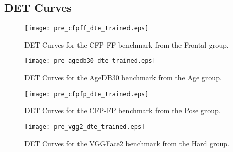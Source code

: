 \documentclass[class=report, crop=false, a4paper, 12pt]{standalone}
\begin{document}
\begin{appendix}
\chapter{DET Curves}\label{appendix:det_curves_appendix}
\begin{figure}[H]
    \centering
    \begin{adjustbox}{center, minipage=1.1\textwidth, margin=0cm -0.1cm 0cm -0.1cm}  %
        \begin{minipage}[c]{0.49\textwidth}
            \centering
            \texttt{[image: pre\_cfpff\_dte\_trained.eps]}
            \caption{DET Curves for the CFP-FF benchmark from the Frontal group.}
            \label{fig:dte_lfw}
        \end{minipage}
        \hfill
        \begin{minipage}[c]{0.49\textwidth}
            \centering
            \texttt{[image: pre\_agedb30\_dte\_trained.eps]}
            \caption{DET Curves for the AgeDB30 benchmark from the Age group.}
            \label{fig:dte_lfw}
        \end{minipage}
    \end{adjustbox}
    \vspace{-0.4cm}
  \end{figure}
  
\begin{figure}[H]
\begin{adjustbox}{center, minipage=1.1\textwidth, margin=0cm -0.1cm 0cm -0.1cm}  %
    \begin{minipage}[c]{0.49\textwidth}
        \centering
        \texttt{[image: pre\_cfpfp\_dte\_trained.eps]}
        \caption{DET Curves for the CFP-FP benchmark from the Pose group.}
        \label{fig:dte_cplfw}
    \end{minipage}
    \hfill
    \begin{minipage}[c]{0.49\textwidth}
        \centering
        \texttt{[image: pre\_vgg2\_dte\_trained.eps]}
        \caption{DET Curves for the VGGFace2 benchmark from the Hard group.}
        \label{fig:dte_xqlfw}
    \end{minipage}
\end{adjustbox}
\vspace{-0.4cm}
\end{figure}

\end{appendix}
\end{document}
